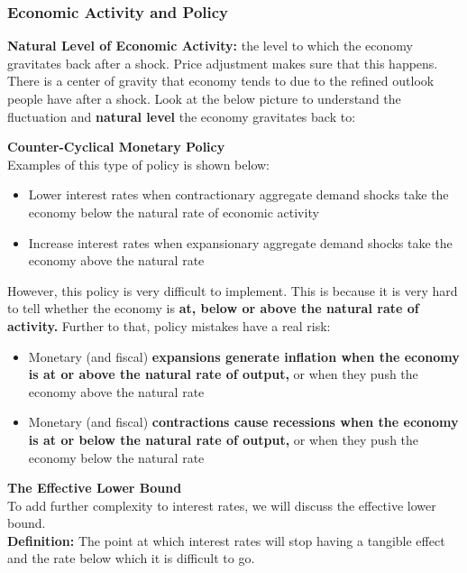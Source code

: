 \documentclass[12pt, letterpaper]{article}
\begin{document}
\subsubsection{Economic Activity and Policy}
\textbf{Natural Level of Economic Activity:} the level to which the economy gravitates back after a shock. Price adjustment makes sure that this happens. There is a center of gravity that economy tends to due to the refined outlook people have after a shock. Look at the below picture to understand the fluctuation and \textbf{natural level} the economy gravitates back to:
\begin{center} %
\end{center}
\textbf{Counter-Cyclical Monetary Policy}\\
Examples of this type of policy is shown below:
\begin{itemize}
	\item Lower interest rates when contractionary aggregate demand shocks take the economy below the natural rate of economic activity
	\item Increase interest rates when expansionary aggregate demand shocks take the economy above the natural rate
\end{itemize}
However, this policy is very difficult to implement. This is because it is very hard to tell whether the economy is \textbf{at, below or above the natural rate of activity.} Further to that, policy mistakes have a real risk:
\begin{itemize}
	\item Monetary (and fiscal) \textbf{expansions generate inflation when the economy is at or above the natural rate of output,} or when they push the economy above the natural rate
	\item Monetary (and fiscal) \textbf{contractions cause recessions when the economy is at or below the natural rate of output,} or when they push the economy below the natural rate\\
\end{itemize}
\textbf{The Effective Lower Bound}\\
To add further complexity to interest rates, we will discuss the effective lower bound.\\
\textbf{Definition:} The point at which interest rates will stop having a tangible effect and the rate below which it is difficult to go.
\end{document}
